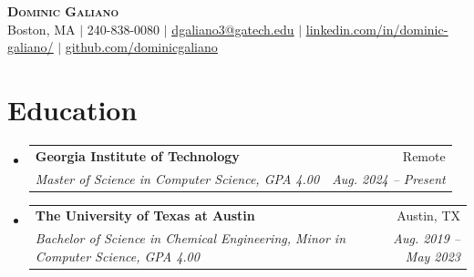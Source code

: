 \documentclass[letterpaper,11pt]{article}
\makeatletter
\newcommand{\resumeSubheading}[4]{
  \vspace{-2pt}\item
    \begin{tabular*}{0.97\textwidth}[t]{l@{\extracolsep{\fill}}r}
      \textbf{#1} & #2 \\
      \textit{\small#3} & \textit{\small #4} \\
    \end{tabular*}\vspace{-7pt}
}
\newcommand{\resumeSubHeadingListStart}{\begin{itemize}[leftmargin=0.15in, label={}]}
\newcommand{\resumeSubHeadingListEnd}{\end{itemize}}
\makeatother
\begin{document}
\newif\ifshowaddress
\showaddressfalse

\ifdefined\WITHADDRESS
  \showaddresstrue
\fi

\begin{center}
    \textbf{\Huge \scshape Dominic Galiano} \\ \vspace{1pt}
    \small 
    \ifshowaddress Boston, MA $|$ \fi
    240-838-0080 $|$ \href{mailto:dgaliano3@gatech.edu}{\underline{dgaliano3@gatech.edu}} $|$ 
    \href{https://linkedin.com/in/dominic-galiano/}{\underline{linkedin.com/in/dominic-galiano/}} $|$
    \href{https://github.com/dominicgaliano}{\underline{github.com/dominicgaliano}}
\end{center}


\section{Education}
  \resumeSubHeadingListStart
    \resumeSubheading
      {Georgia Institute of Technology}{Remote}
      {Master of Science in Computer Science, \textnormal{GPA 4.00}}{Aug. 2024 -- Present}
    \resumeSubheading
      {The University of Texas at Austin}{Austin, TX}
      {Bachelor of Science in Chemical Engineering, Minor in Computer Science, \textnormal{GPA 4.00}}{Aug. 2019 -- May 2023}
  \resumeSubHeadingListEnd


\end{document}
